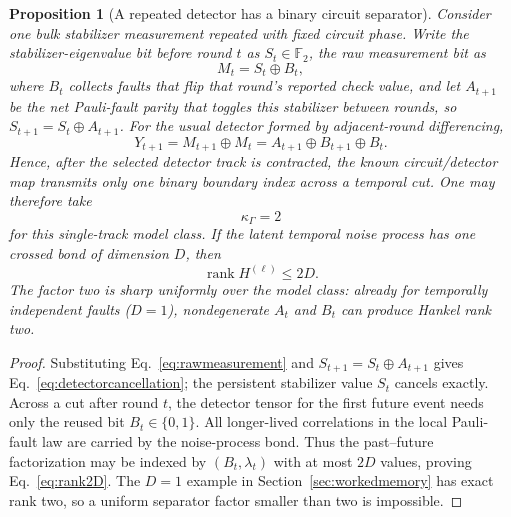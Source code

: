 \documentclass[11pt]{article}
\newtheorem{proposition}[theorem]{Proposition}
\newcommand{\rank}{\operatorname{rank}}
\begin{document}
\begin{proposition}[A repeated detector has a binary circuit separator]
\label{prop:kappa2}
Consider one bulk stabilizer measurement repeated with fixed circuit phase. Write the stabilizer-eigenvalue bit before round $t$ as $S_t\in\mathbb F_2$, the raw measurement bit as
\begin{equation}
    M_t=S_t\oplus B_t,
    \label{eq:rawmeasurement}
\end{equation}
where $B_t$ collects faults that flip that round's reported check value, and let $A_{t+1}$ be the net Pauli-fault parity that toggles this stabilizer between rounds, so $S_{t+1}=S_t\oplus A_{t+1}$. For the usual detector formed by adjacent-round differencing,
\begin{equation}
    Y_{t+1}=M_{t+1}\oplus M_t
    =A_{t+1}\oplus B_{t+1}\oplus B_t.
    \label{eq:detectorcancellation}
\end{equation}
Hence, after the selected detector track is contracted, the known circuit/detector map transmits only one binary boundary index across a temporal cut. One may therefore take
\begin{equation}
    \boxed{\kappa_\Gamma=2}
    \label{eq:kappa2}
\end{equation}
for this single-track model class. If the latent temporal noise process has one crossed bond of dimension $D$, then
\begin{equation}
    \boxed{\rank H^{(\ell)}\le 2D.}
    \label{eq:rank2D}
\end{equation}
The factor two is sharp uniformly over the model class: already for temporally independent faults ($D=1$), nondegenerate $A_t$ and $B_t$ can produce Hankel rank two.
\end{proposition}

\begin{proof}
Substituting Eq.~\eqref{eq:rawmeasurement} and $S_{t+1}=S_t\oplus A_{t+1}$ gives Eq.~\eqref{eq:detectorcancellation}; the persistent stabilizer value $S_t$ cancels exactly. Across a cut after round $t$, the detector tensor for the first future event needs only the reused bit $B_t\in\{0,1\}$. All longer-lived correlations in the local Pauli-fault law are carried by the noise-process bond. Thus the past--future factorization may be indexed by $(B_t,\lambda_t)$ with at most $2D$ values, proving Eq.~\eqref{eq:rank2D}. The $D=1$ example in Section~\ref{sec:workedmemory} has exact rank two, so a uniform separator factor smaller than two is impossible.
\end{proof}
\end{document}
